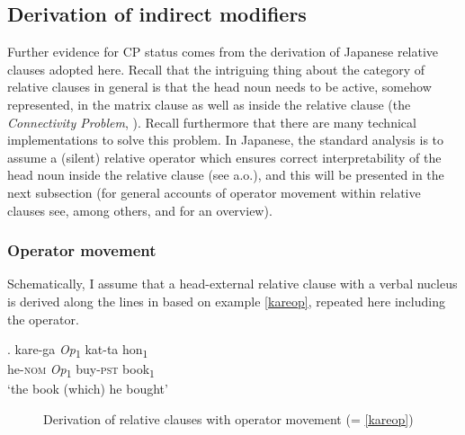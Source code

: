 \subsection{Derivation of indirect modifiers} \label{operator}

Further evidence for CP status comes from the derivation of Japanese relative clauses adopted here. Recall that the intriguing thing about the category of relative clauses in general is that the head noun needs to be active, somehow represented, in the matrix clause as well as inside the relative clause (the \textit{Connectivity Problem}, \citealt{salzmann:2017:reconstruction}). Recall furthermore that there are many technical implementations to solve this problem. In Japanese, the standard analysis is to assume a (silent) relative operator which ensures correct interpretability of the head noun inside the relative clause (see \citealt{miyamoto:2017:RC} a.o.), and this will be presented in the next subsection (for general accounts of operator movement within relative clauses see, among others, \citealt{chomsky:1977:on, jackendoff:1977:x} and \citealt[§ 2]{salzmann:2017:reconstruction} for an overview). 

\subsubsection{Operator movement}

Schematically, I assume that a head-external relative clause with a verbal nucleus is derived along the lines in  based on example \ref{kareop}, repeated here including the operator.
 
\exg. kare-ga \textit{Op}\textsubscript{1} kat-ta hon\textsubscript{1}\\
he-\textsc{nom} \textit{Op}\textsubscript{1} buy-\textsc{pst} book\textsubscript{1}\\
`the book (which) he bought' \label{kareop}

\begin{figure}
\centering
{}
\caption{Derivation of relative clauses with operator movement (= \ref{kareop})}
\label{derivation kareop}
\end{figure}


